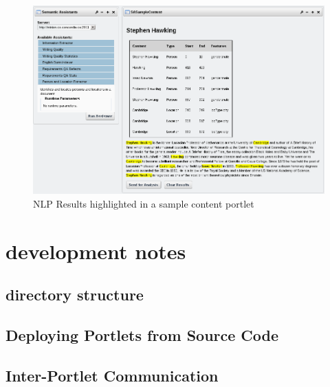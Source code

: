 \begin{figure}
\centering
\includegraphics[scale=0.6]{pictures/liferay_results_portlet.png}
\caption{NLP Results highlighted in a sample content portlet}
\label{fig:liferay_results_portlet}
\end{figure}

\section{development notes}
\subsection{directory structure}
\subsection{Deploying Portlets from Source Code}
\subsection{Inter-Portlet Communication}